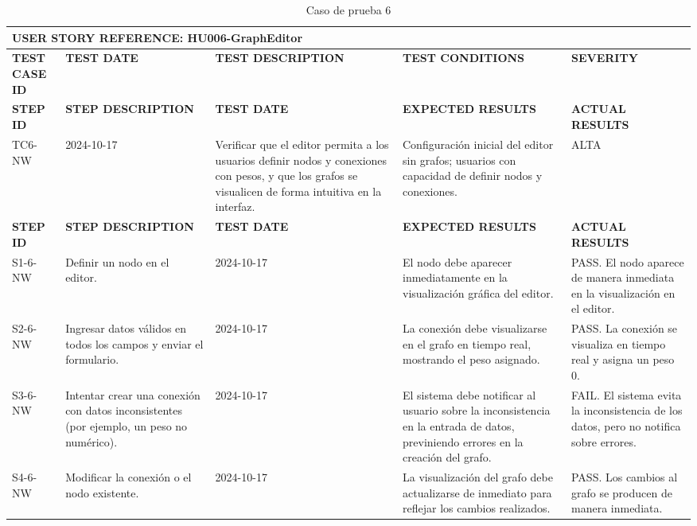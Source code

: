 \documentclass[stu, 12pt, letterpaper, donotrepeattitle, floatsintext, natbib]{apa7}
\begin{document}
\begin{longtable}{|p{2cm}|p{3cm}|p{3cm}|p{3cm}|p{3cm}|}
    \caption{Caso de prueba 6} \label{tab:casos_prueba6} \\
    \hline
        \multicolumn{5}{|l|}{\textbf{USER STORY REFERENCE: HU006-GraphEditor}} \\ \hline

    \textbf{TEST CASE ID} & \textbf{TEST DATE} & \textbf{TEST DESCRIPTION} & \textbf{TEST CONDITIONS} & \textbf{SEVERITY} \\ \hline
    \endfirsthead
    \hline
    \textbf{STEP ID} & \textbf{STEP DESCRIPTION} & \textbf{TEST DATE} & \textbf{EXPECTED RESULTS} & \textbf{ACTUAL RESULTS} \\ \hline
    \endhead
    TC6-NW & 2024-10-17 & Verificar que el editor permita a los usuarios definir nodos y conexiones con pesos, y que los grafos se visualicen de forma intuitiva en la interfaz. & Configuración inicial del editor sin grafos; usuarios con capacidad de definir nodos y conexiones. & ALTA \\ \hline
    \textbf{STEP ID} & \textbf{STEP DESCRIPTION} & \textbf{TEST DATE} & \textbf{EXPECTED RESULTS} & \textbf{ACTUAL RESULTS} \\ \hline
    S1-6-NW & Definir un nodo en el editor. & 2024-10-17 & El nodo debe aparecer inmediatamente en la visualización gráfica del editor. & PASS. El nodo aparece de manera inmediata en la visualización en el editor. \\ \hline
    S2-6-NW & Ingresar datos válidos en todos los campos y enviar el formulario. & 2024-10-17 & La conexión debe visualizarse en el grafo en tiempo real, mostrando el peso asignado. & PASS. La conexión se visualiza en tiempo real y asigna un peso 0. \\ \hline
    S3-6-NW & Intentar crear una conexión con datos inconsistentes (por ejemplo, un peso no numérico). & 2024-10-17 & El sistema debe notificar al usuario sobre la inconsistencia en la entrada de datos, previniendo errores en la creación del grafo. & FAIL. El sistema evita la inconsistencia de los datos, pero no notifica sobre errores. \\ \hline
    S4-6-NW & Modificar la conexión o el nodo existente. & 2024-10-17 & La visualización del grafo debe actualizarse de inmediato para reflejar los cambios realizados. & PASS. Los cambios al grafo se producen de manera inmediata. \\ \hline
\end{longtable}
\end{document}
